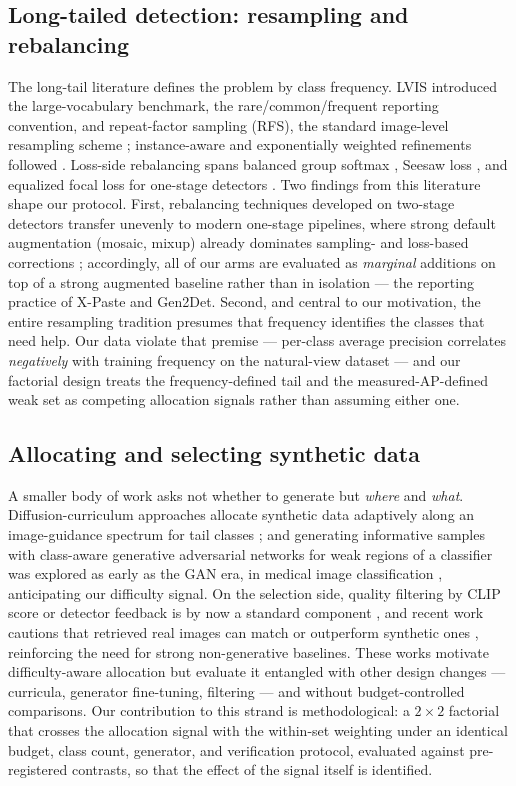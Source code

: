 \documentclass[preprint,12pt,authoryear]{elsarticle}
\begin{document}
\subsection{Long-tailed detection: resampling and rebalancing}

The long-tail literature defines the problem by class frequency. LVIS
introduced the large-vocabulary benchmark, the rare/common/frequent
reporting convention, and repeat-factor sampling (RFS), the standard
image-level resampling scheme \citep{gupta2019lvis}; instance-aware and
exponentially weighted refinements followed \citep{yaman2023irfs,
ahmed2025eirfs}. Loss-side rebalancing spans balanced group softmax
\citep{li2020bags}, Seesaw loss \citep{wang2021seesaw}, and equalized
focal loss for one-stage detectors \citep{li2022efl}. Two findings from
this literature shape our protocol. First, rebalancing techniques
developed on two-stage detectors transfer unevenly to modern one-stage
pipelines, where strong default augmentation (mosaic, mixup) already
dominates sampling- and loss-based corrections \citep{crasto2024imbalance};
accordingly, all of our arms are evaluated as \emph{marginal} additions
on top of a strong augmented baseline rather than in isolation --- the
reporting practice of X-Paste and Gen2Det. Second, and central to our
motivation, the entire resampling tradition presumes that frequency
identifies the classes that need help. Our data violate that premise ---
per-class average precision correlates \emph{negatively} with training
frequency on the natural-view dataset --- and our factorial design
treats the frequency-defined tail and the measured-AP-defined weak set
as competing allocation signals rather than assuming either one.

\subsection{Allocating and selecting synthetic data}

A smaller body of work asks not whether to generate but \emph{where} and
\emph{what}. Diffusion-curriculum approaches allocate synthetic data
adaptively along an image-guidance spectrum for tail classes
\citep{liang2025discl}; and generating informative samples with
class-aware generative adversarial networks for weak regions of a
classifier was explored as early as the GAN era, in medical image
classification \citep{bozorgtabar2019informative}, anticipating our
difficulty signal. On the selection side, quality filtering by CLIP
score or detector feedback is by now a standard component
\citep{suri2023gen2det, fan2024divergen}, and recent work cautions that
retrieved real images can match or outperform synthetic ones
\citep{geng2024unmet}, reinforcing the need for strong non-generative
baselines. These works motivate difficulty-aware allocation but evaluate
it entangled with other design changes --- curricula, generator
fine-tuning, filtering --- and without budget-controlled comparisons.
Our contribution to this strand is methodological: a $2\times2$
factorial that crosses the allocation signal with the within-set
weighting under an identical budget, class count, generator, and
verification protocol, evaluated against pre-registered contrasts, so
that the effect of the signal itself is identified.
\end{document}
